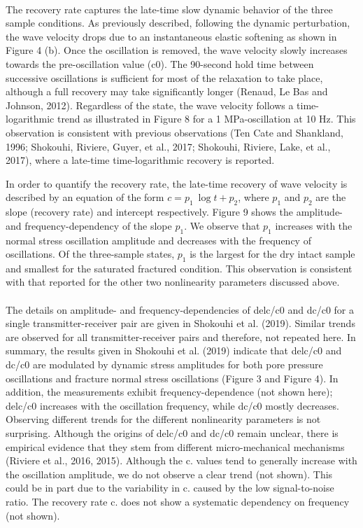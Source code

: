 \documentclass[letterpaper,10pt]{article}
\begin{document}
\paragraph{}
The recovery rate captures the late-time slow dynamic behavior of the three sample conditions. As previously described, following the dynamic perturbation, the wave velocity drops due to an instantaneous elastic softening as shown in Figure 4 (b).  Once the oscillation is removed, the wave velocity slowly increases towards the pre-oscillation value (c0). The 90-second hold time between successive oscillations is sufficient for most of the relaxation to take place, although a full recovery may take significantly longer (Renaud, Le Bas and Johnson, 2012). Regardless of the state, the wave velocity follows a time-logarithmic trend as illustrated in Figure 8 for a 1 MPa-oscillation at 10 Hz. This observation is consistent with previous observations (Ten Cate and Shankland, 1996; Shokouhi, Riviere, Guyer, et al., 2017; Shokouhi, Riviere, Lake, et al., 2017), where a late-time time-logarithmic recovery is reported.  

In order to quantify the recovery rate, the late-time recovery of wave velocity is described by an equation of the form $ c = p_1\ \log{t} + p_2 $, where $p_1$ and $p_2$ are the slope (recovery rate) and intercept respectively. Figure 9 shows the amplitude- and frequency-dependency of the slope $p_1$. We observe that $p_1$ increases with the normal stress oscillation amplitude and decreases with the frequency of oscillations. Of the three-sample states, $p_1$ is the largest for the dry intact sample and smallest for the saturated fractured condition. This observation is consistent with that reported for the other two nonlinearity parameters discussed above. 

\paragraph{}
The details on amplitude- and frequency-dependencies of 
delc/c0 and dc/c0 for a single transmitter-receiver pair are given in Shokouhi et al. (2019). Similar trends are observed for all transmitter-receiver pairs and therefore, not repeated here. In summary, the results given in Shokouhi et al. (2019) indicate that delc/c0 and 
dc/c0 are modulated by dynamic stress amplitudes for both pore pressure oscillations and fracture normal stress oscillations (Figure 3 and Figure 4). In addition, the measurements exhibit frequency-dependence (not shown here); delc/c0 increases with the oscillation frequency, while dc/c0 mostly decreases. Observing different trends for the different nonlinearity parameters is not surprising. Although the origins of delc/c0 and dc/c0
remain unclear, there is empirical evidence that they stem from different micro-mechanical mechanisms (Riviere et al., 2016, 2015). 
Although the c. values tend to generally increase with the oscillation amplitude, we do not observe a clear trend (not shown). This could be in part due to the variability in 
c. caused by the low signal-to-noise ratio. The recovery rate c. does not show a systematic dependency on frequency (not shown).  
\end{document}
